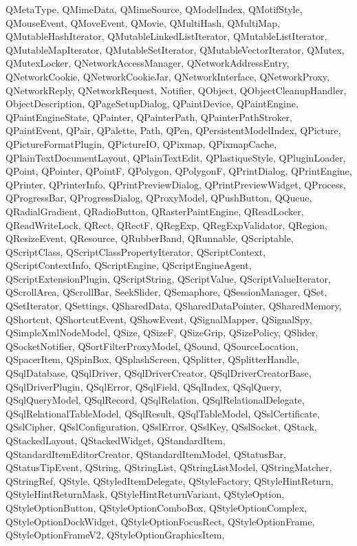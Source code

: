 {{QMetaType, QMimeData, QMimeSource, QModelIndex, QMotifStyle, QMouseEvent,
QMoveEvent, QMovie, QMultiHash, QMultiMap, QMutableHashIterator,
QMutableLinkedListIterator, QMutableListIterator, QMutableMapIterator,
QMutableSetIterator, QMutableVectorIterator, QMutex, QMutexLocker,
QNetworkAccessManager, QNetworkAddressEntry, QNetworkCookie, QNetworkCookieJar,
QNetworkInterface, QNetworkProxy, QNetworkReply, QNetworkRequest, Notifier,
QObject, QObjectCleanupHandler, ObjectDescription, QPageSetupDialog,
QPaintDevice, QPaintEngine, QPaintEngineState, QPainter, QPainterPath,
QPainterPathStroker, QPaintEvent, QPair, QPalette, Path, QPen,
QPersistentModelIndex, QPicture, QPictureFormatPlugin, QPictureIO, QPixmap,
QPixmapCache, QPlainTextDocumentLayout, QPlainTextEdit, QPlastiqueStyle,
QPluginLoader, QPoint, QPointer, QPointF, QPolygon, QPolygonF, QPrintDialog,
QPrintEngine, QPrinter, QPrinterInfo, QPrintPreviewDialog, QPrintPreviewWidget,
QProcess, QProgressBar, QProgressDialog, QProxyModel, QPushButton, QQueue,
QRadialGradient, QRadioButton, QRasterPaintEngine, QReadLocker, QReadWriteLock,
QRect, QRectF, QRegExp, QRegExpValidator, QRegion, QResizeEvent, QResource,
QRubberBand, QRunnable, QScriptable, QScriptClass, QScriptClassPropertyIterator,
QScriptContext, QScriptContextInfo, QScriptEngine, QScriptEngineAgent,
QScriptExtensionPlugin, QScriptString, QScriptValue, QScriptValueIterator,
QScrollArea, QScrollBar, SeekSlider, QSemaphore, QSessionManager, QSet,
QSetIterator, QSettings, QSharedData, QSharedDataPointer, QSharedMemory,
QShortcut, QShortcutEvent, QShowEvent, QSignalMapper, QSignalSpy,
QSimpleXmlNodeModel, QSize, QSizeF, QSizeGrip, QSizePolicy, QSlider,
QSocketNotifier, QSortFilterProxyModel, QSound, QSourceLocation, QSpacerItem,
QSpinBox, QSplashScreen, QSplitter, QSplitterHandle, QSqlDatabase, QSqlDriver,
QSqlDriverCreator, QSqlDriverCreatorBase, QSqlDriverPlugin, QSqlError,
QSqlField, QSqlIndex, QSqlQuery, QSqlQueryModel, QSqlRecord, QSqlRelation,
QSqlRelationalDelegate, QSqlRelationalTableModel, QSqlResult, QSqlTableModel,
QSslCertificate, QSslCipher, QSslConfiguration, QSslError, QSslKey, QSslSocket,
QStack, QStackedLayout, QStackedWidget, QStandardItem,
QStandardItemEditorCreator, QStandardItemModel, QStatusBar, QStatusTipEvent,
QString, QStringList, QStringListModel, QStringMatcher, QStringRef, QStyle,
QStyledItemDelegate, QStyleFactory, QStyleHintReturn, QStyleHintReturnMask,
QStyleHintReturnVariant, QStyleOption, QStyleOptionButton, QStyleOptionComboBox,
QStyleOptionComplex, QStyleOptionDockWidget, QStyleOptionFocusRect,
QStyleOptionFrame, QStyleOptionFrameV2, QStyleOptionGraphicsItem,
}}
